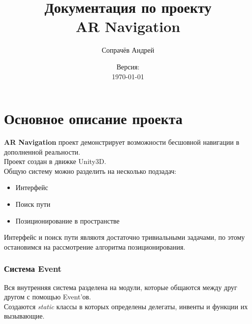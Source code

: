 \documentclass[a4paper, 11pt, titlepage]{article}
\title{Документация по проекту \\ \textbf{AR Navigation}}
\author{Сопрачёв Андрей}
\date{Версия: \versionnumber \\ \today}
\begin{document}
\sffamily
\maketitle

\tableofcontents
\newpage

\part{Основное описание проекта}
  \textbf{AR Navigation} проект демонстрирует возможности бесшовной навигации в дополненной реальности. \\
  Проект создан в движке Unity3D.\\
  Общую систему можно разделить на несколько подзадач:
  \begin{itemize}
    \item Интерфейс
    \item Поиск пути
    \item Позиционирование в пространстве
  \end{itemize}
  Интерфейс и поиск пути являютя достаточно тривиальными задачами, по этому остановимся на рассмотрение алгоритма 
  позиционирования.


%

  \section{Система Event}
  Вся внутренняя система разделена на модули, которые общаются между друг другом с помощью Event'ов.\\
  Создаются \textit{static} классы в которых определены делегаты, инвенты и функции их вызывающие.
\end{document}
